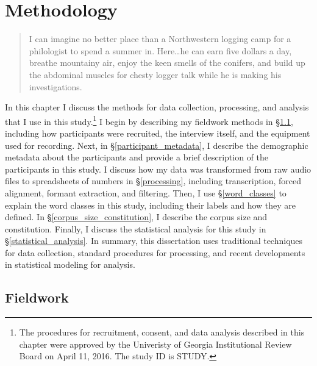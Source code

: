 \chapter{Methodology}
\label{ch:methodology}

\begin{quote}
    I can imagine no better place than a Northwestern logging camp for a philologist to spend a summer in. Here\ldots he can earn five dollars a day, breathe mountainy air, enjoy the keen smells of the conifers, and build up the abdominal muscles for chesty logger talk while he is making his investigations. \citep[139--140]{stevens_1925}
\end{quote}

In this chapter I discuss the methods for data collection, processing, and analysis that I use in this study.\footnote{The procedures for recruitment, consent, and data analysis described in this chapter were approved by the Univeristy of Georgia Institutional Review Board on April 11, 2016. The study ID is STUDY.} I begin by describing my fieldwork methods in \S\ref{fieldwork}, including how participants were recruited, the interview itself, and the equipment used for recording. Next, in \S\ref{participant_metadata}, I describe the demographic metadata about the participants and provide a brief description of the participants in this study. I discuss how my data was transformed from raw audio files to spreadsheets of numbers in \S\ref{processing}, including transcription, forced alignment, formant extraction, and filtering. Then, I use \S\ref{word_classes} to explain the word classes in this study, including their labels and how they are defined. In \S\ref{corpus_size_constitution}, I describe the corpus size and constitution. Finally, I discuss the statistical analysis for this study in \S\ref{statistical_analysis}. In summary, this dissertation uses traditional techniques for data collection, standard procedures for processing, and recent developments in statistical modeling for analysis.


\section{Fieldwork}
\label{fieldwork}

